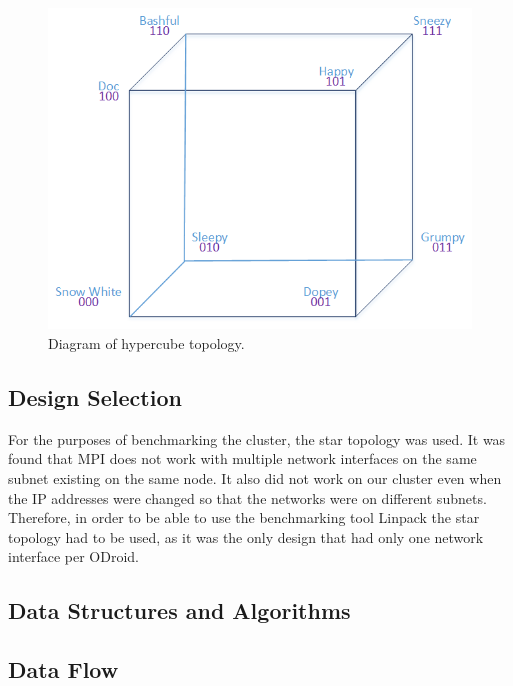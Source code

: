 \begin{figure}[h]
	\caption{Diagram of hypercube topology.}
	\centering
		\includegraphics[scale=0.5]{HyperCube2.png}
\end{figure}


 \subsection{Design Selection}
	For the purposes of benchmarking the cluster, the star topology was used. It was found that MPI does not work with multiple network interfaces on the same subnet existing on the same node. It also did not work on our cluster even when the IP addresses were changed so that the networks were on different subnets. Therefore, in order to be able to use the benchmarking tool Linpack the star topology had to be used, as it was the only design that had only one network interface per ODroid.
 
 \subsection{Data Structures and Algorithms}
	

 \subsection{Data Flow}
 
